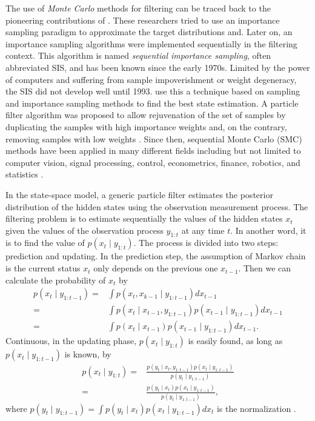 The use of \textit{Monte Carlo} methods for filtering can be traced back to the pioneering contributions of \citep{handschin1969monte, handschin1970monte}. These researchers tried to use an importance sampling paradigm to approximate the target distributions and. Later on, an importance sampling algorithms were implemented sequentially in the filtering context. This algorithm is named \textit{sequential importance sampling}, often abbreviated SIS, and has been known since the early 1970s. Limited by the power of computers and suffering from sample impoverishment or weight degeneracy, the SIS did not develop well until 1993. \cite{gordon1993novel} use this a technique based on sampling and importance sampling methods to find the best state estimation. A particle filter algorithm was proposed to allow rejuvenation of the set of samples by duplicating the samples with high importance weights and, on the contrary, removing samples with low weights \citep{cappe2009inference}. Since then, sequential Monte Carlo (SMC) methods have been applied in many different fields including but not limited to computer vision, signal processing, control, econometrics, finance, robotics, and statistics \citep{smcmip2011, ristic2004beyond}.

In the state-space model, a generic particle filter estimates the posterior distribution of the hidden states using the observation measurement process. The filtering problem is to estimate sequentially the values of the hidden states $x_t$ given the values of the observation process $y_{1:t}$ at any time $t$. In another word, it is to find the value of $p(x_t  \mid  y_{1:t})$. The process is divided into two steps: prediction and updating. In the prediction step, the assumption of Markov chain is the current status $x_t $ only depends on the previous one $x_{t-1}$. Then we can calculate the probability of $x_t$ by 
\begin{align*}
p(x_t \mid y_{1:t-1})=&\int p(x_t ,x_{k-1}\mid y_{1:t-1}) dx_{t-1}\\
=&\int p(x_t \mid x_{t-1},y_{1:t-1}) p(x_{t-1}\mid y_{1:t-1})dx_{t-1}\\
=&\int p(x_t \mid x_{t-1}) p(x_{t-1}\mid y_{1:t-1})dx_{t-1}.
\end{align*}
Continuous, in the updating phase, $p(x_t \mid y_{1:t})$ is easily found, as long as $p(x_t \mid y_{1:t-1})$ is known, by
\begin{align*}
p(x_t \mid y_{1:t})=&\frac{p(y_t \mid x_t ,y_{1:t-1})p(x_{t}\mid y_{1:t-1})}{p(y_t \mid  y_{1:t-1})} \\
=&\frac{p(y_t \mid x_t )p(x_{t}\mid y_{1:t-1})}{p(y_t \mid  y_{1:t-1})},
\end{align*}
where $p(y_t \mid  y_{1:t-1})=\int p(y_t \mid x_t )p(x_t \mid  y_{1:t-1}) dx_t$ is  the normalization \citep{arulampalam2002tutorial}.

